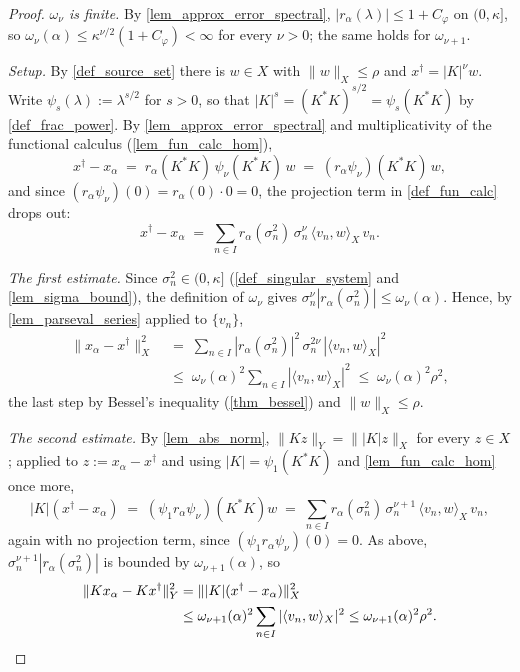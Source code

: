 \documentclass[a4paper]{report}
\theoremstyle{plain}
\theoremstyle{definition}
\theoremstyle{remark}
\newcommand{\dg}{^{\dagger}}
\begin{document}
\begin{proof}
  \emph{$\omega_{\nu}$ is finite.}  By \cref{lem_approx_error_spectral},
  $|r_{\alpha}(\lambda)| \le 1 + C_{\varphi}$ on $(0,\kappa]$, so $\omega_{\nu}(\alpha)
  \le \kappa^{\nu/2}(1+C_{\varphi}) < \infty$ for every $\nu > 0$; the same holds for
  $\omega_{\nu+1}$.

  \emph{Setup.}  By \cref{def_source_set} there is $w \in X$ with $\|w\|_X \le \rho$ and
  $x\dg = |K|^{\nu}w$.  Write $\psi_s(\lambda) := \lambda^{s/2}$ for $s > 0$, so that
  $|K|^{s} = (K^{*}K)^{s/2} = \psi_s(K^{*}K)$ by \cref{def_frac_power}.  By
  \cref{lem_approx_error_spectral} and multiplicativity of the functional calculus
  (\cref{lem_fun_calc_hom}),
  \[
    x\dg - x_{\alpha} \;=\; r_{\alpha}(K^{*}K)\,\psi_{\nu}(K^{*}K)\,w
      \;=\; (r_{\alpha}\psi_{\nu})(K^{*}K)\,w ,
  \]
  and since $(r_{\alpha}\psi_{\nu})(0) = r_{\alpha}(0)\cdot 0 = 0$, the projection term
  in \cref{def_fun_calc} drops out:
  \[
    x\dg - x_{\alpha} \;=\; \sum_{n \in I} r_{\alpha}(\sigma_n^{2})\,\sigma_n^{\nu}\,
      \langle v_n, w\rangle_X\, v_n .
  \]

  \emph{The first estimate.}  Since $\sigma_n^{2} \in (0,\kappa]$
  (\cref{def_singular_system} and \cref{lem_sigma_bound}), the definition of
  $\omega_{\nu}$ gives $\sigma_n^{\nu}|r_{\alpha}(\sigma_n^{2})| \le
  \omega_{\nu}(\alpha)$.  Hence, by \cref{lem_parseval_series} applied to $\{v_n\}$,
  \[
    \begin{aligned}
      \|x_{\alpha} - x\dg\|_X^{2}
        &\;=\; \sum_{n \in I} |r_{\alpha}(\sigma_n^{2})|^{2}\,\sigma_n^{2\nu}\,
          |\langle v_n,w\rangle_X|^{2} \\
        &\;\le\; \omega_{\nu}(\alpha)^{2}\sum_{n \in I}|\langle v_n,w\rangle_X|^{2}
          \;\le\; \omega_{\nu}(\alpha)^{2}\rho^{2},
    \end{aligned}
  \]
  the last step by Bessel's inequality (\cref{thm_bessel}) and $\|w\|_X \le \rho$.

  \emph{The second estimate.}  By \cref{lem_abs_norm}, $\|Kz\|_Y = \||K|z\|_X$ for every
  $z \in X$; applied to $z := x_{\alpha} - x\dg$ and using $|K| = \psi_1(K^{*}K)$ and
  \cref{lem_fun_calc_hom} once more,
  \[
    |K|(x\dg - x_{\alpha}) \;=\; (\psi_1 r_{\alpha}\psi_{\nu})(K^{*}K)w
      \;=\; \sum_{n \in I} r_{\alpha}(\sigma_n^{2})\,\sigma_n^{\nu+1}\,
        \langle v_n,w\rangle_X\, v_n ,
  \]
  again with no projection term, since $(\psi_1r_{\alpha}\psi_{\nu})(0) = 0$.  As above,
  $\sigma_n^{\nu+1}|r_{\alpha}(\sigma_n^{2})|$ is bounded by $\omega_{\nu+1}(\alpha)$,
  so
  \begin{align*}
      \|Kx_{\alpha} - Kx\dg\|_Y^{2} &= \||K|(x\dg - x_{\alpha})\|_X^{2} \\
        &\le \omega_{\nu+1}(\alpha)^{2}\sum_{n \in I}|\langle v_n,w\rangle_X|^{2}
        \le \omega_{\nu+1}(\alpha)^{2}\rho^{2} . \qedhere
  \end{align*}
\end{proof}
\end{document}
